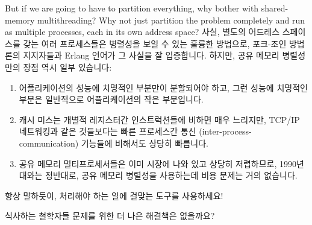 \begin{enumerate}
	But if we are going to have to partition everything, why bother
	with shared-memory multithreading?
	Why not just partition the problem completely and run as
	multiple processes, each in its own address space?
	\fi
\QuickA{}
	사실, 별도의 어드레스 스페이스를 갖는 여러 프로세스들은 병렬성을 보일
	수 있는 훌륭한 방법으로, 포크-조인 방법론의 지지자들과 Erlang 언어가 그
	사실을 잘 입증합니다.
	하지만, 공유 메모리 병렬성만의 장점 역시 일부 있습니다:
	\begin{enumerate}
	\item	어플리케이션의 성능에 치명적인 부분만이 분할되어야 하고, 그런
		성능에 치명적인 부분은 일반적으로 어플리케이션의 작은
		부분입니다.
	\item	캐시 미스는 개별적 레지스터간 인스트럭션들에 비하면 매우
		느리지만, TCP/IP 네트워킹과 같은 것들보다는 빠른 프로세스간
		통신 (inter-process-communication) 기능들에 비해서도 상당히
		빠릅니다.
	\item	공유 메모리 멀티프로세서들은 이미 시장에 나와 있고 상당히
		저렵하므로, 1990년대와는 정반대로, 공유 메모리 병렬성을
		사용하는데 비용 문제는 거의 없습니다.
	\end{enumerate}
	항상 말하듯이, 처리해야 하는 일에 걸맞는 도구를 사용하세요!

\QuickQ{}
	식사하는 철학자들 문제를 위한 더 나은 해결책은 없을까요?
	\iffalse


\end{enumerate}
